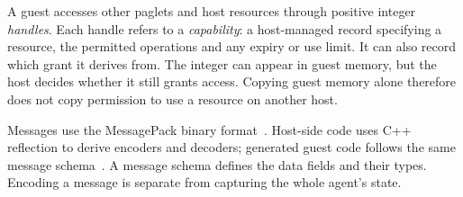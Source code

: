 A guest accesses other paglets and host resources through positive integer
\emph{handles}. Each handle refers to a \emph{capability}: a host-managed
record specifying a resource, the permitted operations and any expiry or
use limit. It can also record which grant it derives from. The integer
can appear in guest memory, but the host decides whether it still grants
access. Copying guest memory alone therefore does not copy permission
to use a resource on another host.

Messages use the MessagePack binary format~\cite{msgpackSpec}. Host-side
code uses C++ reflection to derive encoders and decoders; generated guest
code follows the same message schema~\cite{p2996r13}. A message schema
defines the data fields and their types. Encoding a message is separate
from capturing the whole agent's state.


